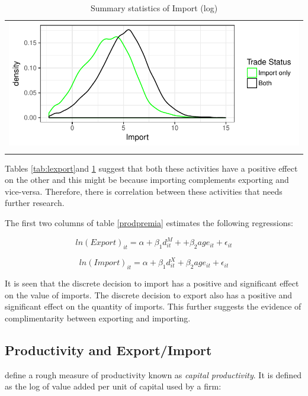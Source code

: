 \documentclass[11pt]{article}
\begin{document}
\begin{center}
\begin{table}[htp]
\caption{Summary statistics of Import (log)}
\label{tab:limport}
\begin{tabular}{c}
 \includegraphics{./PICS/denslimport.pdf}   \\ 
   \\  
\end{tabular}
\end{table}
\end{center}
Tables \ref{tab:lexport}and   \ref{tab:limport} suggest that both these activities have a
positive effect on the other and this might be because importing
complements exporting and vice-versa. Therefore, there is correlation between these
activities that needs further research. 

The first two columns of table \ref{prodpremia} estimates the
following regressions:

$$  ln(Export)_{it} = \alpha +  \beta_{1} d_{it}^{M}+
+ \beta_{2} age_{it} + \epsilon_{it}$$

$$  ln(Import)_{it} = \alpha + \beta_{1} d_{it}^{X} + \beta_{2} age_{it} + \epsilon_{it}$$ 

\begin{center}

\end{center}

It is seen that the discrete decision to import has a positive and
significant effect on the value of imports. The discrete decision to
export also has a positive and significant effect on the quantity of
imports.  This further suggests the evidence of complimentarity
between exporting and importing. 
\subsection{Productivity and Export/Import}
\cite{gupta2018exporting} define a rough measure of productivity known
as \textit{capital productivity}. It is defined as the log of value added per
unit of capital used by a firm:
\end{document}
